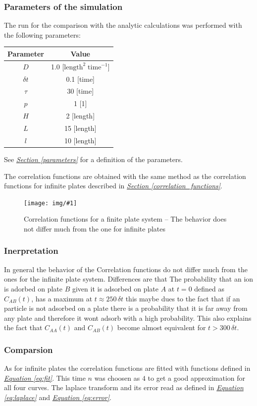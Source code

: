 \documentclass[a4paper, parskip=half]{scrartcl}
\newcommand{\myImage}[2]{
	\begin{figure}[H]
	\centering
	\texttt{[image: img/\#1]}
	\caption{#2}
	\label{pic:#1}
	\end{figure}
}
\newcommand{\myEqRef}[1]{\textit{\hyperref[eq:#1]{Equation \ref*{eq:#1}}}}
\newcommand{\mySecRef}[1]{\textit{\hyperref[#1]{Section \ref*{#1}}}}
\begin{document}
\subsubsection{Parameters of the simulation}
The run for the comparison with the analytic calculations was performed with the following parameters:
\begin{center}
\begin{tabular}{c|c}
Parameter & Value \\\hline
$D$ & 1.0 [$\mathrm{length}^2\; \mathrm{time}^{-1}$]\\
$\delta t$ & 0.1 [time]\\
$\tau$ & 30 [time]\\
$p$ & 1 [1]\\
$H$ & 2 [length] \\
$L$ & 15 [length] \\
$l$ & 10 [length]
\end{tabular}
\end{center}
See \mySecRef{parameters} for a definition of the parameters.

The correlation functions are obtained with the same method as the correlation functions for infinite plates described in \mySecRef{correlation_functions}.
\myImage{limited_correlation}{Correlation functions for a finite plate system -- The behavior does not differ much from the one for infinite plates}

\subsubsection{Inerpretation}
In general the behavior of the Correlation functions do not differ much from the ones for the infinite plate system. Differences are that The probability that an ion is adorbed on plate $B$ given it is adsorbed on plate $A$ at $t=0$ defined as $C_{AB}(t)$, has a maximum at $t \approx 250\, \delta t$ this maybe dues to the fact that if an particle is not adsorbed on a plate there is a probability that it is far away from any plate and therefore it wont adsorb with a high probability. This also explains the fact that $C_{AA}(t)$ and $C_{AB}(t)$ become almost equivalent for $t > 300\, \delta t$.

\subsubsection{Comparsion}
As for infinite plates the correlation functions are fitted with functions defined in \myEqRef{fit}. This time $n$ was choosen as $4$ to get a good approximation for all four curves. The laplace transform and its error read as defined in \myEqRef{laplace} and \myEqRef{error}.
\end{document}
